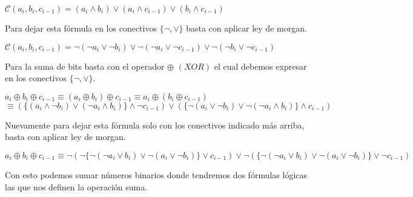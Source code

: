 \documentclass[10pt]{article}
\begin{document}
\begin{enumerate}
    \begin{center}
        $\mathcal{C}(a_i, b_i, c_{i-1})=(a_i\wedge b_i)\vee(a_i\wedge c_{i-1})\vee(b_i\wedge c_{i-1})$ 
    \end{center}
    Para dejar esta fórmula en los conectivos $\{\neg, \vee\}$ basta con aplicar ley de morgan.
    \begin{center}
        $\mathcal{C}(a_i, b_i, c_{i-1})=\neg(\neg a_i\vee \neg b_i)\vee\neg(\neg a_i\vee \neg c_{i-1})\vee\neg(\neg b_i\vee \neg c_{i-1})$ \\
    \end{center}

    Para la suma de bits basta con el operador $\oplus$ $(XOR)$ el cual debemos expresar en los conectivos $\{\neg,\vee\}$.
    \begin{center}
        $a_i\oplus b_i\oplus c_{i-1}\equiv (a_i\oplus b_i)\oplus c_{i-1}\equiv a_i\oplus(b_i\oplus c_{i-1})$\\
        $\equiv (\{(a_i\wedge\neg b_i)\vee(\neg a_i\wedge b_i)\}\wedge \neg c_{i-1})\vee(\{\neg(a_i\vee\neg b_i)\vee\neg(\neg a_i\wedge b_i)\}\wedge c_{i-1})$
    \end{center}
    Nuevamente para dejar esta fórmula solo con los conectivos indicado más arriba, basta con aplicar ley de morgan.
    \begin{center}
        $a_i\oplus b_i\oplus c_{i-1}\equiv\neg(\neg\{\neg(\neg a_i\vee b_i)\vee\neg(a_i\vee\neg b_i)\}\vee c_{i-1})\vee\neg(\{\neg(\neg a_i\vee b_i)\vee\neg(a_i\vee\neg b_i)\}\vee\neg c_{i-1})$
    \end{center}

    Con esto podemos sumar números binarios donde tendremos dos fórmulas lógicas las que nos definen la operación suma.

    \end{enumerate}

    
\end{document}
